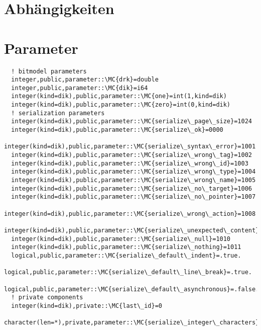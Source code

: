 \section{Abhängigkeiten}
\section{Parameter}
\begin{Verbatim}
  ! bitmodel parameters
  integer,public,parameter::\MC{drk}=double
  integer,public,parameter::\MC{dik}=i64
  integer(kind=dik),public,parameter::\MC{one}=int(1,kind=dik)
  integer(kind=dik),public,parameter::\MC{zero}=int(0,kind=dik)
  ! serialization parameters
  integer(kind=dik),public,parameter::\MC{serialize\_page\_size}=1024
  integer(kind=dik),public,parameter::\MC{serialize\_ok}=0000
  integer(kind=dik),public,parameter::\MC{serialize\_syntax\_error}=1001
  integer(kind=dik),public,parameter::\MC{serialize\_wrong\_tag}=1002
  integer(kind=dik),public,parameter::\MC{serialize\_wrong\_id}=1003
  integer(kind=dik),public,parameter::\MC{serialize\_wrong\_type}=1004
  integer(kind=dik),public,parameter::\MC{serialize\_wrong\_name}=1005
  integer(kind=dik),public,parameter::\MC{serialize\_no\_target}=1006
  integer(kind=dik),public,parameter::\MC{serialize\_no\_pointer}=1007
  integer(kind=dik),public,parameter::\MC{serialize\_wrong\_action}=1008
  integer(kind=dik),public,parameter::\MC{serialize\_unexpected\_content}=1009
  integer(kind=dik),public,parameter::\MC{serialize\_null}=1010
  integer(kind=dik),public,parameter::\MC{serialize\_nothing}=1011
  logical,public,parameter::\MC{serialize\_default\_indent}=.true.
  logical,public,parameter::\MC{serialize\_default\_line\_break}=.true.
  logical,public,parameter::\MC{serialize\_default\_asynchronous}=.false.
  ! private components
  integer(kind=dik),private::\MC{last\_id}=0
  character(len=*),private,parameter::\MC{serialize\_integer\_characters}="-0123456789"
\end{Verbatim}
